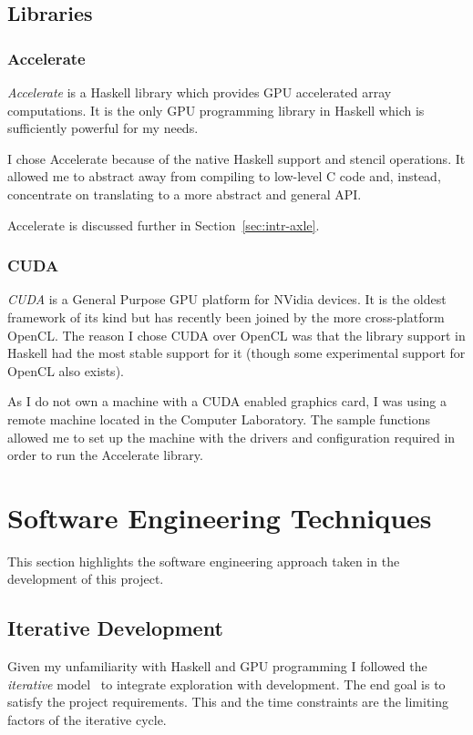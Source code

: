 \documentclass[
    12pt,
    a4paper,
    twoside,
    openright,
    ]{scrbook}
\begin{document}
\subsection{Libraries}
\subsubsection{Accelerate}

\emph{Accelerate} is a Haskell library which provides GPU accelerated array
computations. It is the only GPU programming library in Haskell which is
sufficiently powerful for my needs.

I chose Accelerate because of the native Haskell support and stencil
operations. It allowed me to abstract away from compiling to low-level C code
and, instead, concentrate on translating to a more abstract and general API.

Accelerate is discussed further in Section~\ref{sec:intr-axle}.

\subsubsection{CUDA}

\emph{CUDA} is a General Purpose GPU platform for NVidia devices\cite{cuda}. It
is the oldest framework of its kind but has recently been joined by the more
cross-platform OpenCL. The reason I chose CUDA over OpenCL was that the library
support in Haskell had the most stable support for it (though some experimental
support for OpenCL also exists).

As I do not own a machine with a CUDA enabled graphics card, I was using a
remote machine located in the Computer Laboratory. The sample functions allowed
me to set up the machine with the drivers and configuration required in order to
run the Accelerate library.

\section{Software Engineering Techniques}

This section highlights the software engineering approach taken in the
development of this project.

\subsection{Iterative Development}
\label{sec:iterdev}

Given my unfamiliarity with Haskell and GPU programming I followed the
\emph{iterative} model~\cite{cockburn08} to integrate exploration with
development. The end goal is to satisfy the project requirements. This and the
time constraints are the limiting factors of the iterative cycle.
\end{document}
